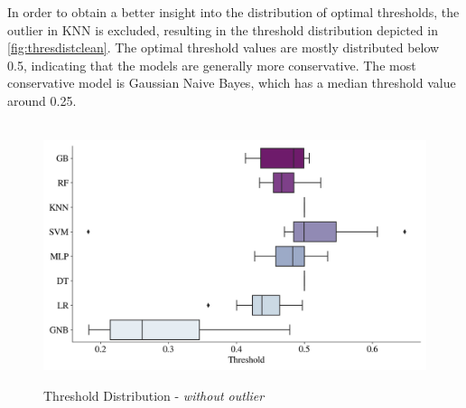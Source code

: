 In order to obtain a better insight into the distribution of optimal thresholds, the outlier in KNN is excluded, resulting in the threshold distribution depicted in \autoref{fig:thresdistclean}. The optimal threshold values are mostly distributed below 0.5, indicating that the models are generally more conservative. The most conservative model is Gaussian Naive Bayes, which has a median threshold value around 0.25.
\begin{figure}[H]
\centering
\caption{Threshold Distribution - \textit{without outlier}}\vspace{0.5em}
\label{fig:thresdistclean}\
\includegraphics[width=140mm]{Figures/Threshold_wo_outliers_Distribution.jpg}

\vspace{-1em}
\end{figure}


